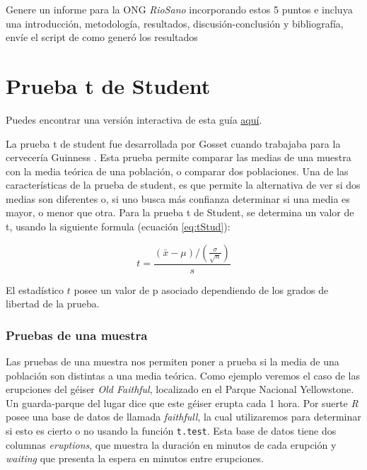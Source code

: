 \documentclass[]{book}
\begin{document}
Genere un informe para la ONG \emph{RioSano} incorporando estos 5 puntos
e incluya una introducción, metodología, resultados,
discusión-conclusión y bibliografía, envíe el script de como generó los
resultados

\chapter{Prueba t de Student}\label{t-student}

Puedes encontrar una versión interactiva de esta guía
\href{http://admin.derek-corcoran-barrios.com/shiny/rstudio/sample-apps/Interactivo5/}{aquí}.

La prueba t de student fue desarrollada por Gosset cuando trabajaba para
la cervecería Guinness \citep{student1908probable}. Esta prueba permite
comparar las medias de una muestra con la media teórica de una
población, o comparar dos poblaciones. Una de las características de la
prueba de student, es que permite la alternativa de ver si dos medias
son diferentes o, si uno busca más confianza determinar si una media es
mayor, o menor que otra. Para la prueba t de Student, se determina un
valor de t, usando la siguiente formula (ecuación \eqref{eq:tStud}):

\begin{equation} 
  t = \frac{(\bar{x} - \mu)/(\frac{\sigma}{\sqrt{n}})}{s}
  \label{eq:tStud}
\end{equation}

El estadístico \(t\) posee un valor de p asociado dependiendo de los
grados de libertad de la prueba.

\subsection{Pruebas de una muestra}\label{pruebas-de-una-muestra}

Las pruebas de una muestra nos permiten poner a prueba si la media de
una población son distintas a una media teórica. Como ejemplo veremos el
caso de las erupciones del géiser \emph{Old Faithful}, localizado en el
Parque Nacional Yellowstone. Un guarda-parque del lugar dice que este
géiser erupta cada 1 hora. Por suerte \emph{R} posee una base de datos
de \citet{azzalini1990look} llamada \emph{faithfull}, la cual
utilizaremos para determinar si esto es cierto o no usando la función
\texttt{t.test}. Esta base de datos tiene dos columnas \emph{eruptions},
que muestra la duración en minutos de cada erupción y \emph{waiting} que
presenta la espera en minutos entre erupciones.
\end{document}
